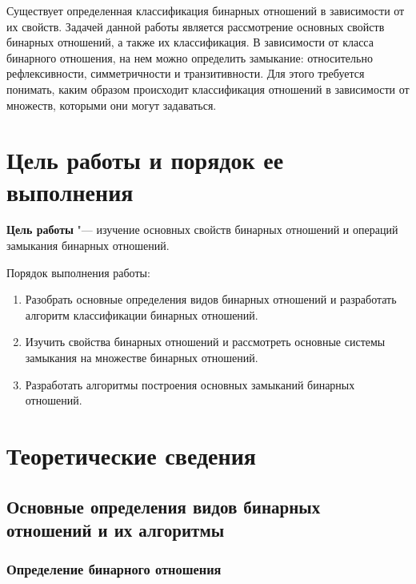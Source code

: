 \documentclass[bachelor, och, labwork]{shiza}
\begin{document}



\tableofcontents

\intro

Существует определенная классификация бинарных отношений в зависимости от их 
свойств. Задачей данной работы является рассмотрение основных свойств бинарных 
отношений, а также их классификация. В зависимости от класса бинарного 
отношения, на нем можно определить замыкание: относительно рефлексивности,
симметричности и транзитивности. Для этого требуется понимать, каким образом 
происходит классификация отношений в зависимости от множеств, которыми они могут
задаваться.

\section{\textbf{Цель работы и порядок ее выполнения}}

\textbf{Цель работы} "--- изучение основных свойств бинарных отношений и 
операций замыкания бинарных отношений.

Порядок выполнения работы:

\begin{enumerate}

    \item Разобрать основные определения видов бинарных отношений и разработать
    алгоритм классификации бинарных отношений.

    \item Изучить свойства бинарных отношений и рассмотреть основные системы
    замыкания на множестве бинарных отношений.

    \item Разработать алгоритмы построения основных замыканий бинарных отношений.

\end{enumerate}

\section{Теоретические сведения}

\subsection{Основные определения видов бинарных отношений и их алгоритмы}

\subsubsection{Определение бинарного отношения}
\end{document}
